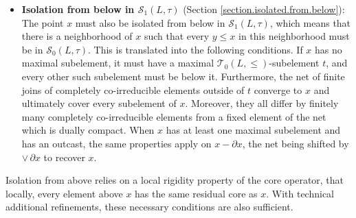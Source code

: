 \documentclass{article}
\newcommand{\comm}[2]{\begin{tcolorbox}[colback=gray!40]\textbf{Comment} (#1) : #2\end{tcolorbox}}
\begin{document}
{\begin{itemize}
\item\textbf{Isolation from below in \(\mathcal{S}_1(L,\tau)\)} (Section \ref{section.isolated.from.below}):  {The point $x$ must also be isolated from below in $\mathcal{S}_1(L,\tau)$, which means that there is a neighborhood of $x$ such that every $y \le x$ in this neighborhood must be in $\mathcal{S}_0(L,\tau)$. This is translated into the following conditions.}
If $x$ has no maximal subelement, it must have a maximal $\mathcal{T}_0(L,\le)$-subelement $t$, and every other such subelement must be below it. Furthermore, the net of finite joins of completely co-irreducible elements outside of $t$ converge to $x$ and ultimately cover every subelement of $x$. Moreover, they all differ by finitely many completely co-irreducible elements from a fixed element of the net which is dually compact. When $x$ has at least one maximal subelement and has an outcast, the same properties apply on \(x-\partial x\), the net being shifted by \(\vee\, \partial x\) to recover \(x\).
\end{itemize}





Isolation from above relies on a local rigidity property of the core operator, that locally, every element above $x$ has the same residual core as $x$. With technical additional refinements, these necessary conditions are also sufficient.}
\end{document}
